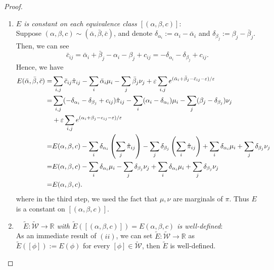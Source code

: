 \begin{proof}
\begin{enumerate}[label=(\roman*)]
		\item \textit{$E$ is constant on each equivalence class $[(\alpha, \beta, c)]$}: \\
		Suppose $(\alpha, \beta, c) \sim (\bar{\alpha}, \bar{\beta}, \bar{c})$, and denote $\delta_{\alpha_i} := \alpha_i - \bar{\alpha}_i$ and $\delta_{\beta_j} := \beta_j - \bar{\beta}_j$. Then, we can see
		\[ \bar{c}_{ij} =\bar{\alpha}_i +\bar{\beta}_j -\alpha_i -\beta_j +c_{ij} = -\delta_{\alpha_i}-\delta_{\beta_j} + c_{ij}. \]
		Hence, we have
		\begin{align*}
		E(\bar{\alpha}, \bar{\beta}, \bar{c}) = & \sum_{i,j} \bar{c}_{ij} \hat{\pi}_{ij} - \sum_i \bar{\alpha}_i \mu_i - \sum_j \bar{\beta}_j \nu_j + \varepsilon \sum_{i,j} e^{(\bar{\alpha}_i + \bar{\beta}_j - \bar{c}_{ij} - \varepsilon)/\varepsilon} \\
			=& \sum_{i,j} (-\delta_{\alpha_i} - \delta_{\beta_j} + c_{ij}) \hat{\pi}_{ij} - \sum_i (\alpha_i - \delta_{\alpha_i}) \mu_i - \sum_j (\beta_j - \delta_{\beta_j}) \nu_j \\
			& + \varepsilon \sum_{i,j} e^{(\alpha_i + \beta_j - c_{ij} - \varepsilon)/\varepsilon}  \\
			=& E(\alpha, \beta, c) - \sum_i \delta_{\alpha_i} \left(\sum_j \hat{\pi}_{ij}\right) - \sum_j \delta_{\beta_j} \left(\sum_i \hat{\pi}_{ij}\right) + \sum_i \delta_{\alpha_i} \mu_i + \sum_j \delta_{\beta_j} \nu_j\\
			 =& E(\alpha, \beta, c) - \sum_i \delta_{\alpha_i} \mu_i - \sum_j \delta_{\beta_j} \nu_j + \sum_i \delta_{\alpha_i} \mu_i + \sum_j \delta_{\beta_j} \nu_j \\
			=& E(\alpha, \beta, c).
		\end{align*}
		where in the third step, we used the fact that $\mu, \nu$ are marginals of $\pi$. Thus $E$ is a constant on $[(\alpha, \beta, c)]$. 
		
		\item \textit{$\quad \widetilde{E}: \widetilde{\mathcal{W}} \rightarrow \mathbb{R}$ with $\widetilde{E}([(\alpha, \beta, c)])=E(\alpha, \beta, c)$ is well-defined}:\\
		As an immediate result of $(i i)$, we can set $\widetilde{E}: \widetilde{\mathcal{W}} \rightarrow \mathbb{R}$ as $\widetilde{E}([\phi]):=E(\phi)$ for every $[\phi] \in \widetilde{\mathcal{W}}$, then $\widetilde{E}$ is well-defined.
		

\end{enumerate}
\end{proof}
